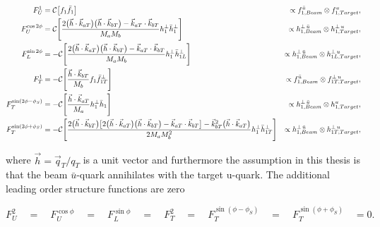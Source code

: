 \begin{align}
  \label{equ::DY_fU1}
  F_{U}^{1} &  =  
  {\cal C}  \big[ f_{1}  \bar{f}_{1} \big]
  &\propto f^{\bar{u}}_{1,Beam} \otimes f^u_{1,Target}, \\
  \label{equ::DY_fUcos2phi}
  F_{U}^{\cos 2\phi} &  =  
  {\cal C}  \Bigg[ \frac{2\big( \vec{h} \cdot \vec{k}_{aT} \big) 
                          \big( \vec{h} \cdot \vec{k}_{bT} \big)
                         - \vec{k}_{aT} \cdot \vec{k}_{bT}} {M_{a} M_{b}}  
    h_{1}^{\perp}  \bar{h}_{1}^{\perp} \Bigg]
  &\propto h^{\perp \, \bar{u}}_{1,Beam} \otimes h^{\perp \, u}_{1,Target}, \\
F_{L}^{\sin 2\phi} &  =  
-  {\cal C}  \Bigg[ \frac{2\big( \vec{h} \cdot \vec{k}_{aT} \big) 
                          \big( \vec{h} \cdot \vec{k}_{bT} \big)
                         - \vec{k}_{aT} \cdot \vec{k}_{bT}} {M_{a} M_{b}}  
                  h_{1}^{\perp}  \bar{h}_{1L}^{\perp} \Bigg]
&\propto h^{\perp \, \bar{u}}_{1,Beam} \otimes h^{\perp \, u}_{1L,Target}, \\
F_{T}^{1} &  =   
- {\cal C}  \Bigg[ \frac{\vec{h} \cdot \vec{k}_{bT}} {M_{b}}  
  f_{1}  \bar{f}_{1T}^{\perp} \Bigg]
&\propto f^{\bar{u}}_{1,Beam} \otimes f^{\perp \, u}_{1T,Target}, \\
F_{T}^{\sin (2\phi - \phi_S)} &  =  
-  {\cal C}  \Bigg[ \frac{\vec{h} \cdot \vec{k}_{aT}} {M_{a}} 
  h_{1}^{\perp}  \bar{h}_{1} \Bigg]
&\propto h^{\perp \, \bar{u}}_{1,Beam} \otimes h^{u}_{1,Target}, \\
\label{equ::DY_fTsin2phiphiS}
F_{T}^{\sin (2\phi + \phi_S)} &  =  
-  {\cal C}  \Bigg[ \frac{2\big( \vec{h} \cdot \vec{k}_{bT} \big)
                    \big[2 \big( \vec{h} \cdot\vec{k}_{aT} \big)
                         \big( \vec{h} \cdot \vec{k}_{bT} \big)
                        -\vec{k}_{aT} \cdot \vec{k}_{bT} \big]
                   - \vec{k}_{bT}^{2} \big( \vec{h} \cdot \vec{k}_{aT} \big)}
                  {2 M_{a} M_{b}^{2}}  
                  h_{1}^{\perp}  \bar{h}_{1T}^{\perp} \Bigg]
&\propto h^{\perp \, \bar{u}}_{1,Beam} \otimes h^{\perp \, u}_{1T,Target},
\end{align}

\noindent
where $\vec{h} = \vec{q}_T/q_T$ is a unit vector and furthermore the assumption
in this thesis is that the beam $\bar{u}$-quark annihilates with the target
u-quark.  The additional leading order structure functions are zero

\begin{equation}
  F_{U}^{2} \quad = \quad F_{U}^{\cos\phi} \quad = \quad F_{L}^{\sin\phi} \quad
  = \quad F_{T}^{2} \quad = \quad F_{T}^{\sin(\phi - \phi_S)} \quad = \quad
  F_{T}^{\sin(\phi + \phi_S)} \quad = 0.
\end{equation}

